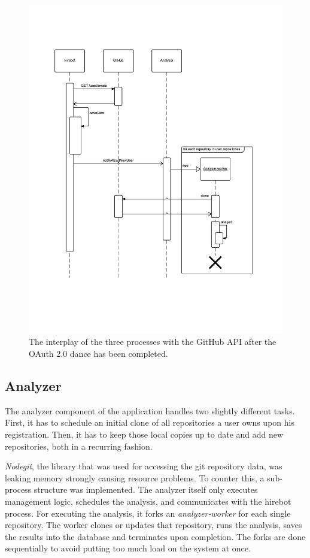 \begin{figure}
  \centering
  \includegraphics[width=35em]{gfx/registersequence.png}
  \caption{The interplay of the three processes with the GitHub API after the OAuth 2.0 dance has been completed.}
  \label{fig:regprocess}
\end{figure}

\subsection{Analyzer}
The analyzer component of the application handles two slightly different tasks. First, it has to schedule an initial clone of all repositories a user owns upon his registration. Then, it has to keep those local copies up to date and add new repositories, both in a recurring fashion.


\textit{Nodegit}, the library that was used for accessing the git repository data, was leaking memory strongly causing resource problems. To counter this, a sub-process structure was implemented. The analyzer itself only executes management logic, schedules the analysis, and communicates with the hirebot process. For executing the analysis, it forks an \textit{analyzer-worker} for each single repository. The worker clones or updates that repository, runs the analysis, saves the results into the database and terminates upon completion. The forks are done sequentially to avoid putting too much load on the system at once.

